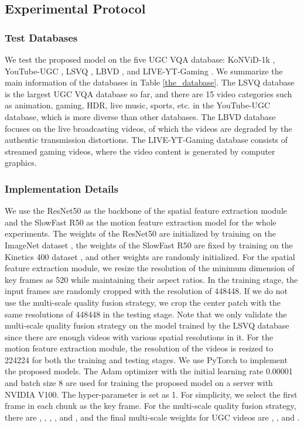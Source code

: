 \documentclass[sigconf]{acmart}
\begin{document}
\subsection{Experimental Protocol}
\subsubsection{Test Databases}
We test the proposed model on the five UGC VQA database: KoNViD-1k \cite{hosu2017konstanz}, YouTube-UGC \cite{wang2019youtube}, LSVQ \cite{ying2021patch},  LBVD \cite{chen2019qoe}, and LIVE-YT-Gaming \cite{yu2022subjective}. We summarize the main information of the databases in Table \ref{the_database}. The LSVQ database is the largest UGC VQA database so far, and there are 15 video categories such as animation, gaming, HDR, live music, sports, etc. in the YouTube-UGC database, which is more diverse than other databases. The LBVD database focuses on the live broadcasting videos, of which the videos are degraded by the authentic transmission distortions. The LIVE-YT-Gaming database consists of streamed gaming videos, where the video content is generated by computer graphics.

\subsubsection{Implementation Details}
We use the ResNet50 \cite{he2016deep} as the backbone of the spatial feature extraction module and the SlowFast R50 \cite{feichtenhofer2019slowfast} as the motion feature extraction model for the whole experiments. The weights of the ResNet50 are initialized by training on the ImageNet dataset \cite{deng2009imagenet}, the weights of the SlowFast R50 are fixed by training on the Kinetics 400 dataset \cite{kay2017kinetics}, and other weights are randomly initialized. For the spatial feature extraction module, we resize the resolution of the minimum dimension of key frames as 520 while maintaining their aspect ratios. In the training stage, the input frames are randomly cropped with the resolution of 448448. If we do not use the multi-scale quality fusion strategy, we crop the center patch with the same resolutions of 448448 in the testing stage. Note that we only validate the multi-scale quality fusion strategy on the model trained by the LSVQ database since there are enough videos with various spatial resolutions in it. For the motion feature extraction module, the resolution of the videos is resized to 224224 for both the training and testing stages. We use PyTorch to implement the proposed models. The Adam optimizer with the initial learning rate 0.00001 and batch size 8 are used for training the proposed model on a server with NVIDIA V100. The hyper-parameter  is set as 1. For simplicity, we select the first frame in each chunk as the key frame. For the multi-scale quality fusion strategy, there are , , , , and , and the final multi-scale weights for UGC videos are , , and .
\end{document}
